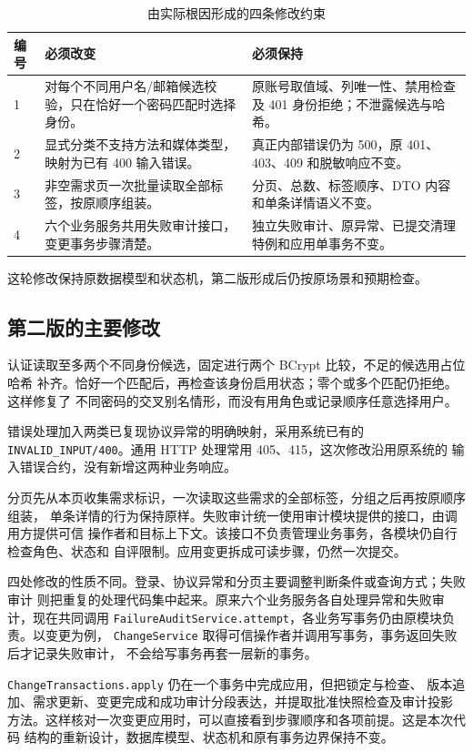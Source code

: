 \documentclass[UTF8,a4paper,12pt]{ctexart}
\newcommand{\code}[1]{\allowbreak\nolinkurl{#1}\allowbreak}
\begin{document}
\begin{table}[H]\centering\small
\caption{由实际根因形成的四条修改约束}\label{tab:constraints}
\begin{tabularx}{\textwidth}{C{0.9cm}Y Y}
\toprule 编号 & 必须改变 & 必须保持\\ & 对每个不同用户名/邮箱候选校验，只在恰好一个密码匹配时选择身份。 & 原账号取值域、列唯一性、禁用检查及 401 身份拒绝；不泄露候选与哈希。\\
2 & 显式分类不支持方法和媒体类型，映射为已有 400 输入错误。 & 真正内部错误仍为 500，原 401、403、409 和脱敏响应不变。\\
3 & 非空需求页一次批量读取全部标签，按原顺序组装。 & 分页、总数、标签顺序、DTO 内容和单条详情语义不变。\\
4 & 六个业务服务共用失败审计接口，变更事务步骤清楚。 & 独立失败审计、原异常、已提交清理特例和应用单事务不变。\\\bottomrule
\end{tabularx}
\end{table}

这轮修改保持原数据模型和状态机，第二版形成后仍按原场景和预期检查。

\subsection{第二版的主要修改}
认证读取至多两个不同身份候选，固定进行两个 BCrypt 比较，不足的候选用占位哈希
补齐。恰好一个匹配后，再检查该身份启用状态；零个或多个匹配仍拒绝。这样修复了
不同密码的交叉别名情形，而没有用角色或记录顺序任意选择用户。

错误处理加入两类已复现协议异常的明确映射，采用系统已有的
\code{INVALID_INPUT/400}。通用 HTTP 处理常用 405、415，这次修改沿用原系统的
输入错误合约，没有新增这两种业务响应。

分页先从本页收集需求标识，一次读取这些需求的全部标签，分组之后再按原顺序组装，
单条详情的行为保持原样。失败审计统一使用审计模块提供的接口，由调用方提供可信
操作者和目标上下文。该接口不负责管理业务事务，各模块仍自行检查角色、状态和
自评限制。应用变更拆成可读步骤，仍然一次提交。

四处修改的性质不同。登录、协议异常和分页主要调整判断条件或查询方式；失败审计
则把重复的处理代码集中起来。原来六个业务服务各自处理异常和失败审计，现在共同调用
\code{FailureAuditService.attempt}，各业务写事务仍由原模块负责。以变更为例，
\code{ChangeService} 取得可信操作者并调用写事务，事务返回失败后才记录失败审计，
不会给写事务再套一层新的事务。

\code{ChangeTransactions.apply} 仍在一个事务中完成应用，但把锁定与检查、
版本追加、需求更新、变更完成和成功审计分段表达，并提取批准快照检查及审计投影
方法。这样核对一次变更应用时，可以直接看到步骤顺序和各项前提。这是本次代码
结构的重新设计，数据库模型、状态机和原有事务边界保持不变。
\end{document}
